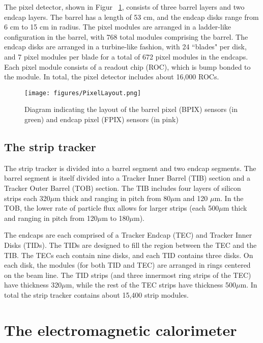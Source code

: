 The pixel detector, shown in Figur ~\ref{fig:PixelLayout}, consists of three barrel layers and two endcap layers. The barrel has a length of 53 cm, and the endcap disks range from 6 cm to 15 cm in radius. The pixel modules are arranged in a ladder-like configuration in the barrel, with 768 total modules comprising the barrel. The endcap disks are arranged in a turbine-like fashion, with 24 ``blades" per disk, and 7 pixel modules per blade for a total of 672 pixel modules in the endcaps.
Each pixel module consists of a readout chip (ROC), which is bump bonded to the module. In total, the pixel detector includes about 16,000 ROCs.

\begin{figure}\centering
  \texttt{[image: figures/PixelLayout.png]}
  \caption{\label{fig:PixelLayout} Diagram indicating the layout of the barrel pixel (BPIX) sensors (in green) and endcap pixel (FPIX) sensors (in pink)}
\end{figure}

\subsection{The strip tracker}

The strip tracker is divided into a barrel segment and two endcap segments. The barrel segment is itself divided into a Tracker Inner Barrel (TIB) section and a Tracker Outer Barrel (TOB) section. The TIB includes four layers of silicon strips each 320$\mu$m thick and ranging in pitch from 80$\mu$m and 120 $\mu$m. In the TOB, the lower rate of particle flux allows for larger strips (each 500$\mu$m thick and ranging in pitch from 120$\mu$m to 180$\mu$m).

The endcaps are each comprised of a Tracker Endcap (TEC) and Tracker Inner Disks (TIDs). The TIDs are designed to fill the region between the TEC and the TIB. The TECs each contain nine disks, and each TID contains three disks. On each disk, the modules (for both TID and TEC) are arranged in rings centered on the beam line. The TID strips (and three innermost ring strips of the TEC) have thickness 320$\mu$m, while the rest of the TEC strips have thickness 500$\mu$m. In total the strip tracker contains about 15,400 strip modules.  



\section{The electromagnetic calorimeter}

